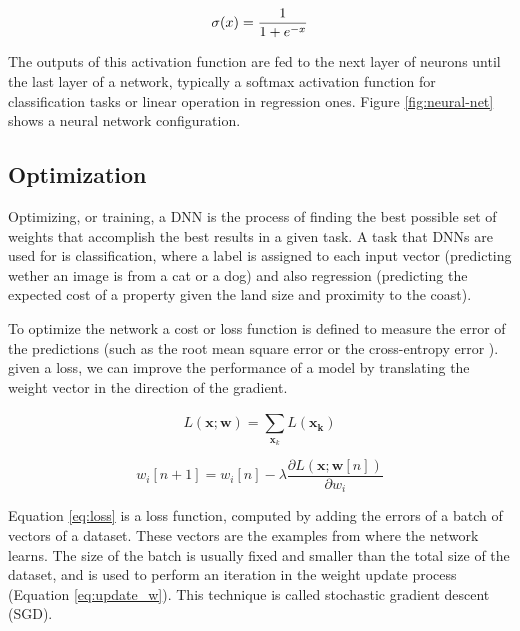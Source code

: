 \begin{equation}
    \centering
    \sigma (x) = \frac{1}{1 + e^{-x}} 
    \label{eq:sigmoid}
\end{equation}

The outputs of this activation function are fed to the next layer of neurons until the last layer of a network, typically a softmax activation function for classification tasks or linear operation in regression ones. Figure \ref{fig:neural-net} shows a neural network configuration.

\subsection{Optimization}

Optimizing, or training, a DNN is the process of finding the best possible set of weights that accomplish the best results in a given task. A task that DNNs are used for is classification, where a label is assigned to each input vector (predicting wether an image is from a cat or a dog) and also regression (predicting the expected cost of a property given the land size and proximity to the coast).

To optimize the network a cost or loss function is defined to measure the error of the predictions (such as the root mean square error or the cross-entropy error \cite{golik2013cross}). given a loss, we can improve the performance of a model by translating the weight vector in the direction of the gradient.

\begin{equation}
    L(\mathbf{x}; \mathbf{w}) = \sum_{\mathbf{x}_k}^{} L (\mathbf{x_k})
    \label{eq:loss}
\end{equation}

\begin{equation}
    w_i[n+1] = w_i[n] - \lambda \frac{\partial L(\mathbf{x}; \mathbf{w}[n])}{\partial w_i}
    \label{eq:update_w}
\end{equation}

Equation \ref{eq:loss} is a loss function, computed by adding the errors of a batch of vectors of a dataset. These vectors are the examples from where the network learns. The size of the batch is usually fixed and smaller than the total size of the dataset, and is used to perform an iteration in the weight update process (Equation \ref{eq:update_w}). This technique is called stochastic gradient descent \cite{bottou2010large} (SGD).


